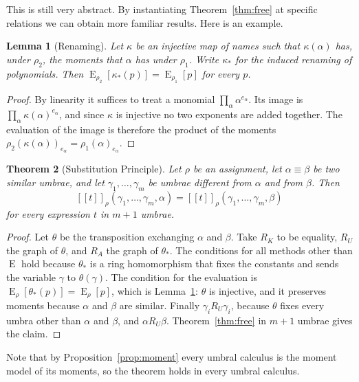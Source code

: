 \documentclass[11pt,a4paper]{report}
\theoremstyle{plain}
\newtheorem{theorem}{Theorem}[chapter]
\newtheorem{lemma}[theorem]{Lemma}
\theoremstyle{definition}
\theoremstyle{remark}
\newcommand{\E}{\operatorname{E}}
\newcommand{\den}[2]{[\![#1]\!]_{#2}}
\begin{document}
This is still very abstract. By instantiating Theorem~\ref{thm:free} at specific relations 
we can obtain more familiar results. Here is an example.

\begin{lemma}[Renaming]
\label{lem:rename}
Let $\kappa$ be an injective map of names such that $\kappa(\alpha)$ has, under
$\rho_2$, the moments that $\alpha$ has under $\rho_1$. Write $\kappa_*$ for the
induced renaming of polynomials. Then
$\E_{\rho_2}[\kappa_*(p)] = \E_{\rho_1}[p]$ for every $p$.
\end{lemma}

\begin{proof}
By linearity it suffices to treat a monomial $\prod_\alpha \alpha^{e_\alpha}$. Its
image is $\prod_\alpha \kappa(\alpha)^{e_\alpha}$, and since $\kappa$ is
injective no two exponents are added together. The evaluation of the image is
therefore the product of the moments
$\rho_2(\kappa(\alpha))_{e_\alpha} = \rho_1(\alpha)_{e_\alpha}$.
\end{proof}

\begin{theorem}[Substitution Principle]
\label{thm:substitution}
Let $\rho$ be an assignment, let $\alpha \equiv \beta$ be two similar umbrae, and
let $\gamma_1, \dots, \gamma_m$ be umbrae different from $\alpha$ and from
$\beta$. Then
\[
  \den{t}{\rho}(\gamma_1, \dots, \gamma_m, \alpha)
    = \den{t}{\rho}(\gamma_1, \dots, \gamma_m, \beta)
\]
for every expression $t$ in $m + 1$ umbrae.
\end{theorem}

\begin{proof}
Let $\theta$ be the transposition exchanging $\alpha$ and $\beta$. Take $R_K$ to
be equality, $R_U$ the graph of $\theta$, and $R_A$ the graph of $\theta_*$. The
conditions for all methods other than $\E$ hold because $\theta_*$ is a ring
homomorphism that fixes the constants and sends the variable $\gamma$ to
$\theta(\gamma)$. The condition for the evaluation is
$\E_\rho[\theta_*(p)] = \E_\rho[p]$, which is Lemma~\ref{lem:rename}: $\theta$ is
injective, and it preserves moments because $\alpha$ and $\beta$ are similar.
Finally $\gamma_i \mathrel{R_U} \gamma_i$, because $\theta$ fixes every umbra
other than $\alpha$ and $\beta$, and $\alpha \mathrel{R_U} \beta$. Theorem~\ref{thm:free}
in $m + 1$ umbrae gives the claim.
\end{proof}

Note that by Proposition~\ref{prop:moment} every
umbral calculus is the moment model of its moments, so the theorem holds in every
umbral calculus.
\end{document}
